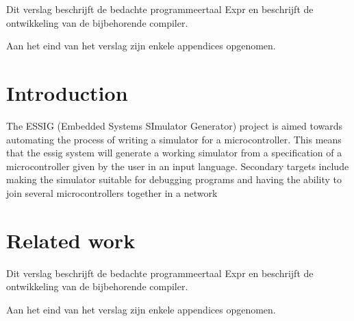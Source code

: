 \documentclass[a4paper]{article}
\begin{document}
\bigskip


\bigskip


\bigskip

\begin{multicols}{2}

\bigskip
\end{multicols}

\bigskip

\section[]{}
\setcounter{tocdepth}{10}
\renewcommand\contentsname{Table of Contents}
\tableofcontents
{}

{\sffamily
Dit verslag beschrijft de bedachte programmeertaal Expr en beschrijft de
ontwikkeling van de bijbehorende compiler.}

{\sffamily
Aan het eind van het verslag zijn enkele appendices opgenomen.}

\clearpage\section{Introduction}
{\sffamily
The ESSIG (Embedded Systems SImulator Generator) project is aimed
towards automating the process of writing a simulator for a
microcontroller. This means that the essig system will generate a
working simulator from a specification of a microcontroller given by
the user in an input language. Secondary targets include making the
simulator suitable for debugging programs and having the ability to
join several microcontrollers together in a network}

\section{}
\clearpage\section{Related work}
{\sffamily
Dit verslag beschrijft de bedachte programmeertaal Expr en beschrijft de
ontwikkeling van de bijbehorende compiler.}

{\sffamily
Aan het eind van het verslag zijn enkele appendices opgenomen.}
\end{document}
